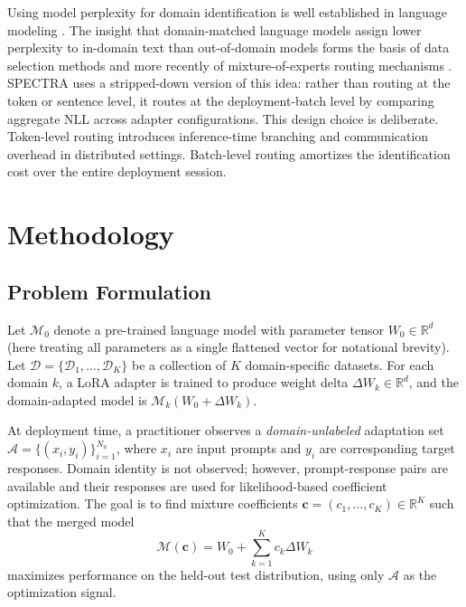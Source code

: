 \documentclass[preprint,12pt]{elsarticle}
\begin{document}
Using model perplexity for domain identification is well established in
language modeling \cite{gururangan2020dontstop, moore2010intelligent}. The
insight that domain-matched language models assign lower perplexity to
in-domain text than out-of-domain models forms the basis of data selection
methods \cite{axelrod2011domain} and more recently of mixture-of-experts
routing mechanisms \cite{shazeer2017outrageously, fedus2022switch}.
SPECTRA uses a stripped-down version of this idea: rather than routing
at the token or sentence level, it routes at the deployment-batch level
by comparing aggregate NLL across adapter configurations. This design choice
is deliberate. Token-level routing introduces inference-time branching and
communication overhead in distributed settings. Batch-level routing amortizes
the identification cost over the entire deployment session.

\section{Methodology}
\label{sec:method}

\subsection{Problem Formulation}
\label{subsec:formulation}

Let $\mathcal{M}_0$ denote a pre-trained language model with parameter tensor
$W_0 \in \mathbb{R}^d$ (here treating all parameters as a single flattened
vector for notational brevity). Let $\mathcal{D} = \{\mathcal{D}_1, \ldots,
\mathcal{D}_K\}$ be a collection of $K$ domain-specific datasets. For each
domain $k$, a LoRA adapter is trained to produce weight delta
$\Delta W_k \in \mathbb{R}^d$, and the domain-adapted model is
$\mathcal{M}_k(W_0 + \Delta W_k)$.

At deployment time, a practitioner observes a \emph{domain-unlabeled}
adaptation set $\mathcal{A} = \{(x_i, y_i)\}_{i=1}^{N_a}$, where $x_i$ are
input prompts and $y_i$ are corresponding target responses. Domain identity
is not observed; however, prompt-response pairs are available and their
responses are used for likelihood-based coefficient optimization. The goal is
to find mixture coefficients $\mathbf{c} = (c_1, \ldots, c_K) \in \mathbb{R}^K$
such that the merged model
\begin{equation}
    \mathcal{M}(\mathbf{c}) = W_0 + \sum_{k=1}^{K} c_k \Delta W_k
    \label{eq:merge}
\end{equation}
maximizes performance on the held-out test distribution, using only
$\mathcal{A}$ as the optimization signal.
\end{document}
